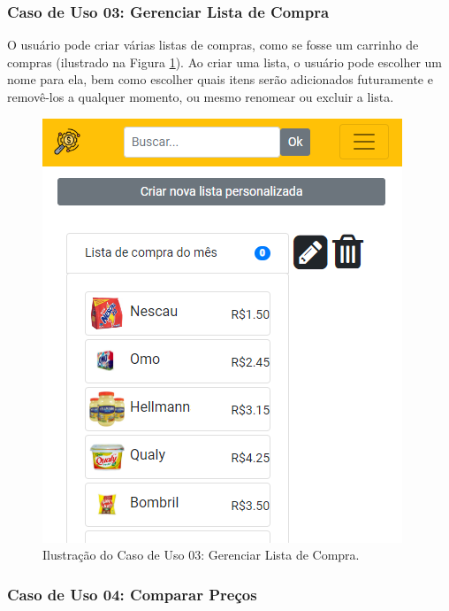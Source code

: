 \subsubsection{Caso de Uso 03: Gerenciar Lista de Compra}

O usuário pode criar várias listas de compras, como se fosse um carrinho de compras (ilustrado na Figura \ref{fig:lista}). Ao criar uma lista, o usuário pode escolher um nome para ela, bem como escolher quais itens serão adicionados futuramente e removê-los a qualquer momento, ou mesmo renomear ou excluir a lista.

\begin{figure}[H]
\centering
\includegraphics[width=\linewidth]{figuras/tela_lista_personalizada.png}
\caption{Ilustração do Caso de Uso 03: Gerenciar Lista de Compra.}
\label{fig:lista}
\end{figure}

\subsubsection{Caso de Uso 04: Comparar Preços}

